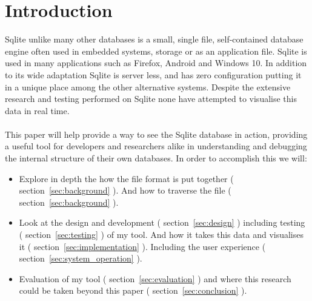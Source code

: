 \section{Introduction}
\label{sec:introduction}
Sqlite unlike many other databases is a small, single file, self-contained database engine often used in embedded systems, storage or as an application file. Sqlite is used in many applications such as Firefox, Android and Windows 10. In addition to its wide adaptation Sqlite is server less, and has zero configuration putting it in a unique place among the other alternative systems. Despite the extensive research and testing performed on Sqlite none have attempted to visualise this data in real time. \\\\
This paper will  help provide a way to see the Sqlite database in action, providing a useful tool for developers and researchers alike in understanding and debugging the internal structure of their own databases. In order to accomplish this we will: 

\begin{itemize}  

\item Explore in depth the how the file format is put together ( section~\ref{sec:background} ). And how to traverse the file ( section~\ref{sec:background} ).

\item Look at the design and development ( section~\ref{sec:design}  ) including testing ( section~\ref{sec:testing} ) of my tool. And how it takes this data and visualises it ( section~\ref{sec:implementation} ). Including the user experience ( section~\ref{sec:system_operation} ).

\item Evaluation of my tool ( section~\ref{sec:evaluation} ) and where this research could be taken beyond this paper ( section~\ref{sec:conclusion} ).

\end{itemize}  